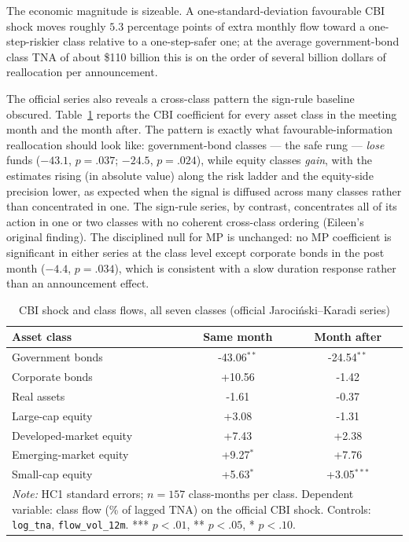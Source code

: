 \documentclass[11pt]{article}
\newcommand{\jk}{Jaroci\'{n}ski--Karadi}
\begin{document}
The economic magnitude is sizeable. A one-standard-deviation favourable CBI
shock moves roughly $5.3$ percentage points of extra monthly flow toward a
one-step-riskier class relative to a one-step-safer one; at the average
government-bond class TNA of about \$110 billion this is on the order of
several billion dollars of reallocation per announcement.

The official series also reveals a cross-class pattern the sign-rule
baseline obscured. Table~\ref{tab:h4grid} reports the CBI coefficient for
every asset class in the meeting month and the month after. The pattern is
exactly what favourable-information reallocation should look like:
government-bond classes --- the safe rung --- \emph{lose} funds
($-43.1$, $p=.037$; $-24.5$, $p=.024$), while equity classes
\emph{gain}, with the estimates rising (in absolute value) along the risk
ladder and the equity-side precision lower, as expected when the signal is
diffused across many classes rather than concentrated in one. The sign-rule
series, by contrast, concentrates all of its action in one or two classes
with no coherent cross-class ordering (Eileen's original finding). The
disciplined null for MP is unchanged: no MP coefficient is significant in
either series at the class level except corporate bonds in the post month
($-4.4$, $p=.034$), which is consistent with a slow duration response
rather than an announcement effect.

\begin{table}[H]
\centering\small
\caption{CBI shock and class flows, all seven classes (official \jk{} series)}
\begin{tabular}{lcc}
\toprule
Asset class & Same month & Month after \\
\midrule
Government bonds & -43.06$^{**}$ & -24.54$^{**}$ \\
Corporate bonds & +10.56 & -1.42 \\
Real assets & -1.61 & -0.37 \\
Large-cap equity & +3.08 & -1.31 \\
Developed-market equity & +7.43 & +2.38 \\
Emerging-market equity & +9.27$^{*}$ & +7.76 \\
Small-cap equity & +5.63$^{*}$ & +3.05$^{***}$ \\
\midrule
\multicolumn{3}{p{.9\linewidth}}{\footnotesize \emph{Note:} HC1 standard errors; $n = 157$ class-months per class. Dependent variable: class flow (\% of lagged TNA) on the official CBI shock. Controls: \texttt{log\_tna}, \texttt{flow\_vol\_12m}. *** $p<.01$, ** $p<.05$, * $p<.10$.}\\
\bottomrule
\end{tabular}
\label{tab:h4grid}
\end{table}
\end{document}
